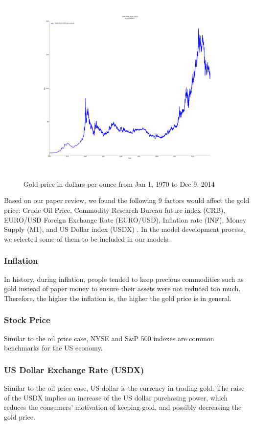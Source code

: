 \documentclass[runningheads]{llncs}
\begin{document}
\begin{figure}
\centering
\includegraphics[width=\textwidth]{Gold_since1970.png}
\caption{Gold price in dollars per ounce from Jan 1, 1970 to Dec 9, 2014}
\label{fig:Gold_since1970.png}
\end{figure}

Based on our paper review, we found the following 9 factors would affect the gold price: Crude Oil Price, Commodity Research Bureau future index (CRB), EURO/USD Foreign Exchange Rate (EURO/USD), Inflation rate (INF), Money Supply (M1), and US Dollar index (USDX) \cite{gold-shafiee}\cite{gold-zhang}\cite{gold-Ismail}. In the model development process, we selected some of them to be included in our models.

\subsubsection{Inflation}
In history, during inflation, people tended to keep precious commodities such as gold instead of paper money to ensure their assets were not reduced too much. Therefore, the higher the inflation is, the higher the gold price is in general.

\subsubsection{Stock Price}
Similar to the oil price case, NYSE and S\&P 500 indexes are common benchmarks for the US economy.

\subsubsection{US Dollar Exchange Rate (USDX)} 
Similar to the oil price case, US dollar is the currency in trading gold. The raise of the USDX implies an increase of the US dollar purchasing power, which reduces the consumers' motivation of keeping gold, and possibly decreasing the gold price.
\end{document}
